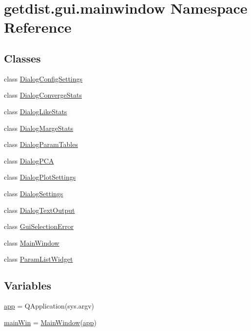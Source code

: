 \hypertarget{namespacegetdist_1_1gui_1_1mainwindow}{}\section{getdist.\+gui.\+mainwindow Namespace Reference}
\label{namespacegetdist_1_1gui_1_1mainwindow}
\subsection*{Classes}
\begin{DoxyCompactItemize}
\item 
class \mbox{\hyperlink{classgetdist_1_1gui_1_1mainwindow_1_1DialogConfigSettings}{Dialog\+Config\+Settings}}
\item 
class \mbox{\hyperlink{classgetdist_1_1gui_1_1mainwindow_1_1DialogConvergeStats}{Dialog\+Converge\+Stats}}
\item 
class \mbox{\hyperlink{classgetdist_1_1gui_1_1mainwindow_1_1DialogLikeStats}{Dialog\+Like\+Stats}}
\item 
class \mbox{\hyperlink{classgetdist_1_1gui_1_1mainwindow_1_1DialogMargeStats}{Dialog\+Marge\+Stats}}
\item 
class \mbox{\hyperlink{classgetdist_1_1gui_1_1mainwindow_1_1DialogParamTables}{Dialog\+Param\+Tables}}
\item 
class \mbox{\hyperlink{classgetdist_1_1gui_1_1mainwindow_1_1DialogPCA}{Dialog\+P\+CA}}
\item 
class \mbox{\hyperlink{classgetdist_1_1gui_1_1mainwindow_1_1DialogPlotSettings}{Dialog\+Plot\+Settings}}
\item 
class \mbox{\hyperlink{classgetdist_1_1gui_1_1mainwindow_1_1DialogSettings}{Dialog\+Settings}}
\item 
class \mbox{\hyperlink{classgetdist_1_1gui_1_1mainwindow_1_1DialogTextOutput}{Dialog\+Text\+Output}}
\item 
class \mbox{\hyperlink{classgetdist_1_1gui_1_1mainwindow_1_1GuiSelectionError}{Gui\+Selection\+Error}}
\item 
class \mbox{\hyperlink{classgetdist_1_1gui_1_1mainwindow_1_1MainWindow}{Main\+Window}}
\item 
class \mbox{\hyperlink{classgetdist_1_1gui_1_1mainwindow_1_1ParamListWidget}{Param\+List\+Widget}}
\end{DoxyCompactItemize}
\subsection*{Variables}
\begin{DoxyCompactItemize}
\item 
\mbox{\hyperlink{namespacegetdist_1_1gui_1_1mainwindow_a324c0739c82a122d31bf680329ea2636}{app}} = Q\+Application(sys.\+argv)
\item 
\mbox{\hyperlink{namespacegetdist_1_1gui_1_1mainwindow_aa2b9cee62174a985e1464509c440dbfa}{main\+Win}} = \mbox{\hyperlink{classgetdist_1_1gui_1_1mainwindow_1_1MainWindow}{Main\+Window}}(\mbox{\hyperlink{namespacegetdist_1_1gui_1_1mainwindow_a324c0739c82a122d31bf680329ea2636}{app}})
\end{DoxyCompactItemize}


